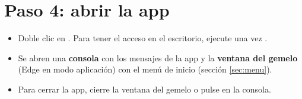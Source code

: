 \documentclass[a4paper,11pt]{article}
\begin{document}
\section{Paso 4: abrir la app}
\begin{itemize}
\item Doble clic en . Para tener el acceso en el escritorio, ejecute una vez .
\item Se abren una \textbf{consola} con los mensajes de la app y la \textbf{ventana del gemelo} (Edge en modo aplicación) con el menú de inicio (sección \ref{sec:menu}).
\item Para cerrar la app, cierre la ventana del gemelo o pulse  en la consola.
\end{itemize}
\end{document}
